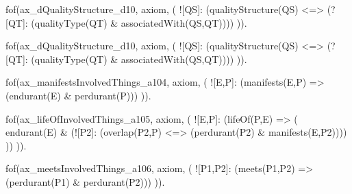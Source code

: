 







fof(ax_dQualityStructure_d10, axiom, (
  ![QS]: (qualityStructure(QS) <=> (?[QT]: (qualityType(QT) & associatedWith(QS,QT))))
)).

fof(ax_dQualityStructure_d10, axiom, (
  ![QS]: (qualityStructure(QS) <=> (?[QT]: (qualityType(QT) & associatedWith(QS,QT))))
)).


fof(ax_manifestsInvolvedThings_a104, axiom, (
  ![E,P]: (manifests(E,P) => (endurant(E) & perdurant(P)))
)).

fof(ax_lifeOfInvolvedThings_a105, axiom, (
  ![E,P]: (lifeOf(P,E) => (
    endurant(E)
    & (![P2]: (overlap(P2,P) <=> (perdurant(P2) & manifests(E,P2))))
  ))
)).


fof(ax_meetsInvolvedThings_a106, axiom, (
  ![P1,P2]: (meets(P1,P2) => (perdurant(P1) & perdurant(P2)))
)).


